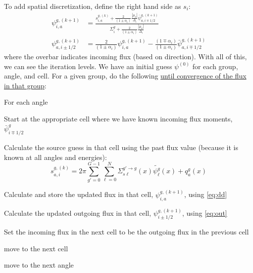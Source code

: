 \documentclass[12pt]{article}
\newcommand{\Di}{\ensuremath{\Delta_i}}
\begin{document}
To add spatial discretization, define the right hand side as $s_i$:
\begin{align}
\psi_{i,a}^{g,(k+1)} &= \frac{s_{i,a}^{g,(k)} + \frac{2}{(1\pm\alpha_i)}\frac{|\mu_a|}{\Di}\bar{\psi}^{g,(k+1)}_{a,i\mp1/2}}{
      \Sigma_{i}^g + \frac{2}{(1\pm\alpha_i)}\frac{|\mu_a|}{\Di}} \label{eq:dd}\\
%
%
\psi_{a,i\pm1/2}^{g,(k+1)} &= \frac{2}{(1\pm\alpha_i)}\psi_{i,a}^{g,(k+1)}-
    \frac{(1\mp\alpha_i)}{(1\pm\alpha_i)}\bar{\psi}_{a,i\mp1/2}^{g,(k+1)} \label{eq:out}
\end{align}
where the overbar indicates incoming flux (based on direction).
With all of this, we can see the iteration levels. We have an initial guess $\psi^{(0)}$ for each group, angle, and cell. For a given group, do the following \underline{until convergence of the flux in that group}:
\begin{compactenum}
\item For each angle
    \begin{compactenum}
    \item Start at the appropriate cell where we have known incoming flux moments, $\bar{\psi}_{i\mp1/2}^{g}$
    \item Calculate the source guess in that cell using the past flux value (because it is known at all angles and energies):
    \[
    s_{a,i}^{g,(k)} = 2\pi \sum_{g'=0}^{G-1}
  \sum_{\ell=0}^N \Sigma_{s\ell}^{g'\rightarrow g}(x) \tilde{\psi^g_\ell}(x) + q_{a}^g(x)
    \]
    \item Calculate and store the updated flux in that cell, $\psi_{i,a}^{g,(k+1)}$, using \autoref{eq:dd} 
    \item Calculate the updated outgoing flux in that cell, $\psi_{i\pm1/2}^{g,(k+1)}$, using \autoref{eq:out}
    \item Set the incoming flux in the next cell to be the outgoing flux in the previous cell
    \item move to the next cell
  \end{compactenum}
  \item move to the next angle
\end{compactenum}
\end{document}
